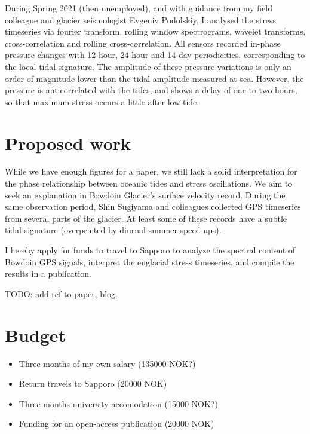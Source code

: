 \documentclass{article}
\begin{document}
    During Spring 2021 (then unemployed), and with guidance from my field
    colleague and glacier seismologist Evgeniy Podolskiy, I analysed the stress
    timeseries via fourier transform, rolling window spectrograms, wavelet
    transforms, cross-correlation and rolling cross-correlation.
    All sensors recorded in-phase pressure changes with 12-hour, 24-hour and
    14-day periodicities, corresponding to the local tidal signature.
    The amplitude of these pressure variations is only an order of magnitude
    lower than the tidal amplitude measured at sea. However, the pressure is
    anticorrelated with the tides, and shows a delay of one to two hours, so
    that maximum stress occurs a little after low tide.

\section{Proposed work}

    While we have enough figures for a paper, we still lack a solid
    interpretation for the phase relationship between oceanic tides and stress
    oscillations. We aim to seek an explanation in Bowdoin Glacier's surface
    velocity record. During the same observation period, Shin Sugiyama and
    colleagues collected GPS timeseries from several parts of the glacier. At
    least some of these records have a subtle tidal signature (overprinted by
    diurnal summer speed-ups).

    I hereby apply for funds to travel to Sapporo to analyze the spectral
    content of Bowdoin GPS signals, interpret the englacial stress timeseries,
    and compile the results in a publication.

    TODO: add ref to paper, blog.

\section{Budget}

    \begin{itemize}
        \item Three months of my own salary (135000 NOK?)
        \item Return travels to Sapporo (20000 NOK)
        \item Three months university accomodation (15000 NOK?)
        \item Funding for an open-access publication (20000 NOK)
    \end{itemize}

\end{document}
